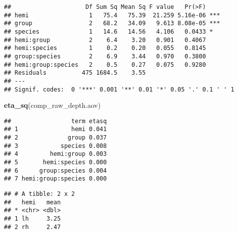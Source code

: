 \documentclass[
]{article}
\newenvironment{Shaded}{\begin{snugshade}}{\end{snugshade}}
\newcommand{\CommentTok}[1]{\textcolor[rgb]{0.56,0.35,0.01}{\textit{#1}}}
\newcommand{\DataTypeTok}[1]{\textcolor[rgb]{0.13,0.29,0.53}{#1}}
\newcommand{\KeywordTok}[1]{\textcolor[rgb]{0.13,0.29,0.53}{\textbf{#1}}}
\newcommand{\NormalTok}[1]{#1}
\newcommand{\OperatorTok}[1]{\textcolor[rgb]{0.81,0.36,0.00}{\textbf{#1}}}
\newcommand{\StringTok}[1]{\textcolor[rgb]{0.31,0.60,0.02}{#1}}
\begin{document}
\begin{verbatim}
##                     Df Sum Sq Mean Sq F value   Pr(>F)    
## hemi                 1   75.4   75.39  21.259 5.16e-06 ***
## group                2   68.2   34.09   9.613 8.08e-05 ***
## species              1   14.6   14.56   4.106   0.0433 *  
## hemi:group           2    6.4    3.20   0.901   0.4067    
## hemi:species         1    0.2    0.20   0.055   0.8145    
## group:species        2    6.9    3.44   0.970   0.3800    
## hemi:group:species   2    0.5    0.27   0.075   0.9280    
## Residuals          475 1684.5    3.55                     
## ---
## Signif. codes:  0 '***' 0.001 '**' 0.01 '*' 0.05 '.' 0.1 ' ' 1
\end{verbatim}

\begin{Shaded}
\begin{Highlighting}[]
\KeywordTok{eta_sq}\NormalTok{(comp_raw_depth.aov)}
\end{Highlighting}
\end{Shaded}

\begin{verbatim}
##                 term etasq
## 1               hemi 0.041
## 2              group 0.037
## 3            species 0.008
## 4         hemi:group 0.003
## 5       hemi:species 0.000
## 6      group:species 0.004
## 7 hemi:group:species 0.000
\end{verbatim}

\begin{Shaded}
\end{Shaded}

\begin{verbatim}
## # A tibble: 2 x 2
##   hemi   mean
## * <chr> <dbl>
## 1 lh     3.25
## 2 rh     2.47
\end{verbatim}

\begin{Shaded}
\end{Shaded}
\end{document}
